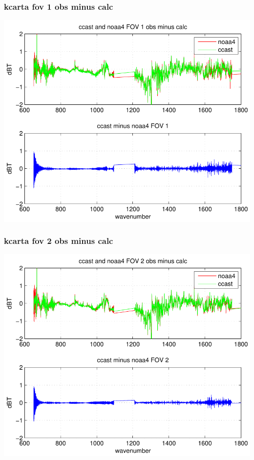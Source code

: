 \documentclass[11pt]{beamer}
\begin{document}
\begin{frame}
\frametitle{kcarta fov 1 obs minus calc}
\begin{center}
  \includegraphics[scale=0.7]{figures/kcarta_FOV1.pdf}
\end{center}
\end{frame}
\begin{frame}
\frametitle{kcarta fov 2 obs minus calc}
\begin{center}
  \includegraphics[scale=0.7]{figures/kcarta_FOV2.pdf}
\end{center}
\end{frame}
\end{document}
